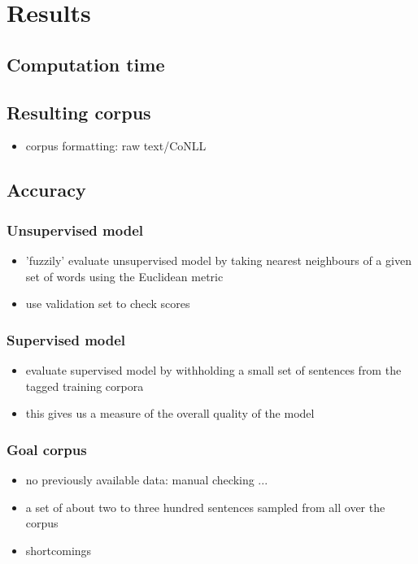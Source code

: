 
\chapter{Results}
\label{chp:interpretation}

\section{Computation time}
\label{sec:computationtime}

\section{Resulting corpus}
\label{sec:result}
\begin{itemize}
\item corpus formatting: raw text/CoNLL
\end{itemize}

\section{Accuracy}
\label{sec:accuracy}

\subsection{Unsupervised model}
\label{sec:unsupacc}
\begin{itemize}
\item 'fuzzily' evaluate unsupervised model by taking nearest neighbours of a
  given set of words using the Euclidean metric
\item use validation set to check scores
\end{itemize}

\subsection{Supervised model}
\label{sec:supacc}
\begin{itemize}
\item evaluate supervised model by withholding a small set of sentences from the tagged training corpora
\item this gives us a measure of the overall quality of the model
\end{itemize}

\subsection{Goal corpus}
\label{sec:supacc}
\begin{itemize}
\item no previously available data: manual checking ...
\item a set of about two to three hundred sentences sampled from all over the corpus
\item shortcomings
\end{itemize}
